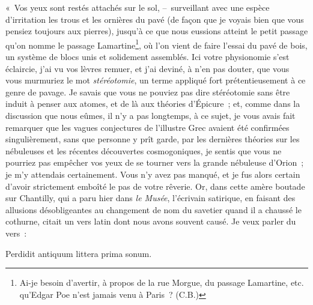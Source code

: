\documentclass[french,twoside]{book} %
\begin{document}
« Vos yeux sont restés attachés sur le sol, – surveillant avec une espèce d’irritation les trous et les ornières du pavé (de façon que je voyais bien que vous pensiez toujours aux pierres), jusqu’à ce que nous eussions atteint le petit passage qu’on nomme le passage Lamartine\footnote{Ai-je besoin d’avertir, à propos de la rue Morgue, du passage Lamartine, etc. qu’Edgar Poe n’est jamais venu à Paris ? (C.B.)}, où l’on vient de faire l’essai du pavé de bois, un système de blocs unis et solidement assemblés. Ici votre physionomie s’est éclaircie, j’ai vu vos lèvres remuer, et j’ai deviné, à n’en pas douter, que vous vous murmuriez le mot \emph{stéréotomie}, un terme appliqué fort prétentieusement à ce genre de pavage. Je savais que vous ne pouviez pas dire stéréotomie sans être induit à penser aux atomes, et de là aux théories d’Épicure ; et, comme dans la discussion que nous eûmes, il n’y a pas longtemps, à ce sujet, je vous avais fait remarquer que les vagues conjectures de l’illustre Grec avaient été confirmées singulièrement, sans que personne y prît garde, par les dernières théories sur les nébuleuses et les récentes découvertes cosmogoniques, je sentis que vous ne pourriez pas empêcher vos yeux de se tourner vers la grande nébuleuse d’Orion ; je m’y attendais certainement. Vous n’y avez pas manqué, et je fus alors certain d’avoir strictement emboîté le pas de votre rêverie. Or, dans cette amère boutade sur Chantilly, qui a paru hier dans \emph{le Musée}, l’écrivain satirique, en faisant des allusions désobligeantes au changement de nom du savetier quand il a chaussé le cothurne, citait un vers latin dont nous avons souvent causé. Je veux parler du vers :\par

Perdidit antiquum littera prima sonum.\\
\end{document}
